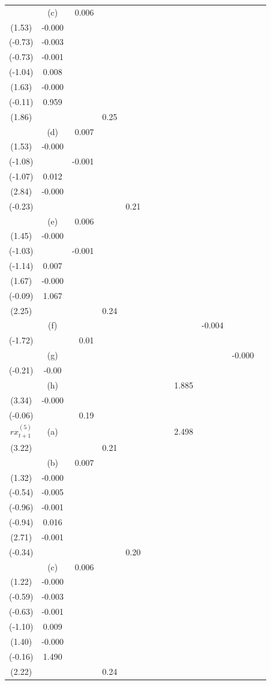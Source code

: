 \begin{table}[p]
\begin{tabular}{ccrrrrrrrrrr}
 & (c) & 0.006\\ (1.53) & -0.000\\ (-0.73) & -0.003\\ (-0.73) & -0.001\\ (-1.04) & 0.008\\ (1.63) & -0.000\\ (-0.11) & 0.959\\ (1.86) &  &  & 0.25\\
 & (d) & 0.007\\ (1.53) & -0.000\\ (-1.08) &  & -0.001\\ (-1.07) & 0.012\\ (2.84) & -0.000\\ (-0.23) &  &  &  & 0.21\\
 & (e) & 0.006\\ (1.45) & -0.000\\ (-1.03) &  & -0.001\\ (-1.14) & 0.007\\ (1.67) & -0.000\\ (-0.09) & 1.067\\ (2.25) &  &  & 0.24\\
 & (f) &  &  &  &  &  &  &  & -0.004\\ (-1.72) &  & 0.01\\
 & (g) &  &  &  &  &  &  &  &  & -0.000\\ (-0.21) & -0.00\\
 & (h) &  &  &  &  &  &  & 1.885\\ (3.34) & -0.000\\ (-0.06) &  & 0.19\\
\hline
$rx^{(5)}_{t+1}$ & (a) &  &  &  &  &  &  & 2.498\\ (3.22) &  &  & 0.21\\
 & (b) & 0.007\\ (1.32) & -0.000\\ (-0.54) & -0.005\\ (-0.96) & -0.001\\ (-0.94) & 0.016\\ (2.71) & -0.001\\ (-0.34) &  &  &  & 0.20\\
 & (c) & 0.006\\ (1.22) & -0.000\\ (-0.59) & -0.003\\ (-0.63) & -0.001\\ (-1.10) & 0.009\\ (1.40) & -0.000\\ (-0.16) & 1.490\\ (2.22) &  &  & 0.24\\

\end{tabular}
\end{table}
